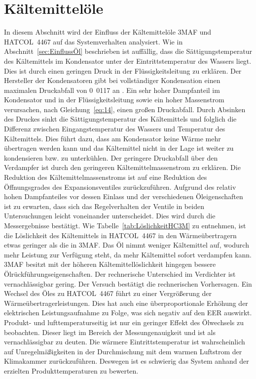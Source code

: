 \section{Kältemittelöle}
\label{sec:Kältemittelöleanalyse}

In diesem Abschnitt wird der Einfluss der Kältemittelöle 3MAF und HATCOL~4467 auf das Systemverhalten analysiert.
Wie in Abschnitt~\ref{sec:EinflussÖl} beschrieben ist auffällig, dass die Sättigungstemperatur des Kältemittels im Kondensator unter der Eintrittstemperatur des Wassers liegt. Dies ist durch einen geringen Druck in der Flüssigkeitsleitung zu erklären. Der Hersteller der Kondensatoren gibt bei vollständiger Kondensation einen maximalen Druckabfall von \unit{0.0117}{\bbar} an \cite{SWEP.2017}. Ein sehr hoher Dampfanteil im Kondensator und in der Flüssigkeitsleitung sowie ein hoher Massenstrom verursachen, nach Gleichung~\ref{eq:14}, einen großen Druckabfall. Durch Absinken des Druckes sinkt die Sättigungstemperatur des Kältemittels und folglich die Differenz zwischen Eingangstemperatur des Wassers und Temperatur des Kältemittels. Dies führt dazu, dass am Kondensator keine Wärme mehr übertragen werden kann und das Kältemittel nicht in der Lage ist weiter zu kondensieren bzw. zu unterkühlen. Der geringere Druckabfall über den Verdampfer ist durch den geringeren Kältemittelmassenstrom zu erklären. Die Reduktion des Kältemittelmassenstroms ist auf eine Reduktion des Öffnungsgrades des Expansionsventiles zurückzuführen. Aufgrund des relativ hohen Dampfanteiles vor dessen Einlass und der verschiedenen Öleigenschaften ist zu erwarten, dass sich das Regelverhalten der Ventile in beiden Untersuchungen leicht voneinander unterscheidet. Dies wird durch die Messergebnisse bestätigt. \newline
Wie Tabelle~\ref{tab:LöslichkeitHC3M} zu entnehmen, ist die Löslichkeit des Kältemittels in HATCOL~4467 in den Wärmeübertragern etwas geringer als die in 3MAF. Das Öl nimmt weniger Kältemittel auf, wodurch mehr Leistung zur Verfügung steht, da mehr Kältemittel sofort verdampfen kann. 3MAF besitzt mit der höheren Kältemittellöslichkeit hingegen bessere Ölrückführungseigenschaften. Der rechnerische Unterschied im Verdichter ist vernachlässigbar gering.
Der Versuch bestätigt die rechnerischen Vorhersagen. Ein Wechsel des Öles zu HATCOL~4467 führt zu einer Vergrößerung der Wärmeübertragerleistungen. Dies hat auch eine überproportionale Erhöhung der elektrischen Leistungsaufnahme zu Folge, was sich negativ auf den EER auswirkt.
Produkt- und lufttemperaturseitig ist nur ein geringer Effekt des Ölwechsels zu beobachten. Dieser liegt im Bereich der Messungenauigkeit und ist als vernachlässigbar zu deuten. Die wärmere Eintrittstemperatur ist wahrscheinlich auf Unregelmäßigkeiten in der Durchmischung mit dem warmen Luftstrom der Klimakammer zurückzuführen. Deswegen ist es schwierig das System anhand der erzielten Produkttemperaturen zu bewerten.

